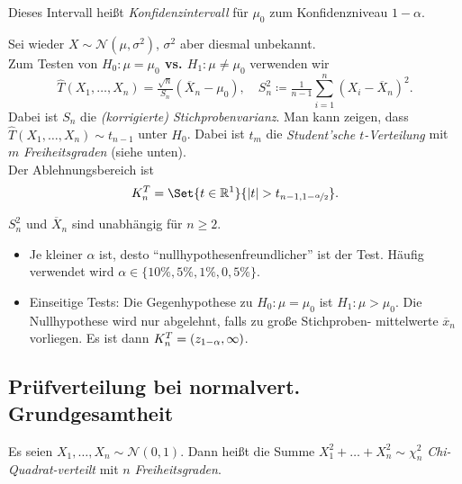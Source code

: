 \documentclass{cheat-sheet}
\newcommand{\testh}[1]{\textcolor{TestColor}{\textbf{#1}}}
\newcommand{\Normal}{\mathcal{N}} %
\begin{document}
\begin{defn}
  Dieses Intervall heißt \emph{Konfidenzintervall} für $\mu_0$ zum Konfidenzniveau $1-\alpha$.
\end{defn}

\begin{test}
  Sei wieder $X \sim \Normal(\mu, \sigma^2)$, $\sigma^2$ aber diesmal unbekannt. \\
  Zum Testen von \testh{$H_0 : \mu = \mu_0$ vs. $H_1 : \mu \neq \mu_0$} verwenden wir
  \[
    \hat{T}(X_1, \ldots, X_n) = \tfrac{\sqrt{n}}{S_n} \left( \overline{X}_n - \mu_0 \right), \quad
    S_n^2 \coloneqq \tfrac{1}{n-1} \sum_{i=1}^n \left( X_i - \overline{X}_n \right)^2.
  \]
  Dabei ist $S_n$ die \emph{(korrigierte) Stichprobenvarianz}.
  Man kann zeigen, dass $\hat{T}(X_1, \ldots, X_n) \sim t_{n-1}$ unter $H_0$.
  Dabei ist $t_m$ die \emph{Student'sche $t$-Verteilung} mit $m$ \textit{Freiheitsgraden} (siehe unten). \\
  Der Ablehnungsbereich ist
  \[ K_n^T = \Set{t \in \R^1}{\abs{t} > t_{n-1,1-\nicefrac{\alpha}{2}}}. \]
\end{test}

\begin{bem}
  $S_n^2$ und $\overline{X}_n$ sind unabhängig für $n \geq 2$. %
\end{bem}

\begin{diskussion}
  \begin{itemize}
    \item Je kleiner $\alpha$ ist, desto "`nullhypothesenfreundlicher"' ist der Test.
    Häufig verwendet wird $\alpha \in \{ 10\%, 5\%, 1\%, 0,5\% \}$.
    \item Einseitige Tests: Die Gegenhypothese zu $H_0 \!:\! \mu \!=\! \mu_0$ ist $H_1 \!:\! \mu \!>\! \mu_0$.
    Die Nullhypothese wird nur abgelehnt, falls zu große Stichproben- mittelwerte $\overline{x}_n$ vorliegen. Es ist dann $K_n^T = \left( z_{1-\alpha}, \infty \right)$.
  \end{itemize}
\end{diskussion}

\subsection{Prüfverteilung bei normalvert. Grundgesamtheit}

\begin{defn}
  Es seien $X_1, \ldots, X_n \sim \Normal(0, 1)$.
  Dann heißt die Summe $X_1^2 + \ldots + X_n^2 \sim \chi_n^2$ \emph{Chi-Quadrat-verteilt} mit $n$ \textit{Freiheitsgraden}.
\end{defn}
\end{document}
